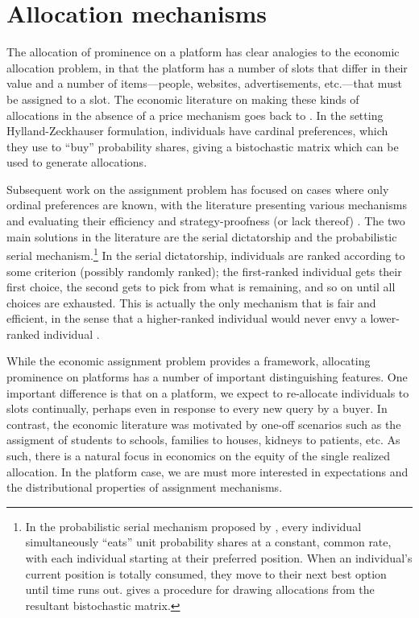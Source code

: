 
\section{Allocation mechanisms}
The allocation of prominence on a platform has clear analogies to the
economic allocation problem, in that the platform has a number of
slots that differ in their value and a number of items---people,
websites, advertisements, etc.---that must be assigned to a slot. The
economic literature on making these kinds of allocations in the
absence of a price mechanism goes back to
\cite{hylland1979efficient}. In the setting Hylland-Zeckhauser
formulation, individuals have cardinal preferences, which they use to
``buy'' probability shares, giving a bistochastic matrix which can be
used to generate allocations.

Subsequent work on the assignment problem has focused on cases where
only ordinal preferences are known, with the literature presenting
various mechanisms and evaluating their efficiency and
strategy-proofness (or lack thereof)
\citep{kojima2010incentives,manea2007serial,abdulkadiroglu1999house}. The
two main solutions in the literature are the serial dictatorship and
the probabilistic serial mechanism.\footnote{In the probabilistic
  serial mechanism proposed by \cite{bogomolnaia2001new}, every
  individual simultaneously ``eats'' unit probability shares at a
  constant, common rate, with each individual starting at their
  preferred position. When an individual's current position is totally
  consumed, they move to their next best option until time runs
  out. \cite{budish2009implementing} gives a procedure for drawing
  allocations from the resultant bistochastic matrix.}  In the serial
dictatorship, individuals are ranked according to some criterion
(possibly randomly ranked); the first-ranked individual gets their
first choice, the second gets to pick from what is remaining, and so
on until all choices are exhausted. This is actually the only
mechanism that is fair and efficient, in the sense that a
higher-ranked individual would never envy a lower-ranked individual
\cite{balinski1999tale}.

While the economic assignment problem provides a framework, allocating
prominence on platforms has a number of important distinguishing
features. One important difference is that on a platform, we expect to
re-allocate individuals to slots continually, perhaps even in response
to every new query by a buyer. In contrast, the economic literature
was motivated by one-off scenarios such as the assigment of students
to schools, families to houses, kidneys to patients, etc. As such,
there is a natural focus in economics on the equity of the single
realized allocation. In the platform case, we are must more interested
in expectations and the distributional properties of assignment
mechanisms.

